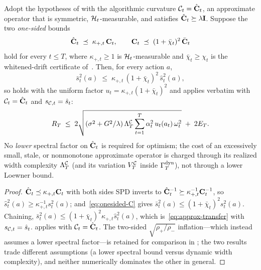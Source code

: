 \begin{theorem}\label{thm:spectral-distortion}
Adopt the hypotheses of  with the algorithmic curvature
$\mathcal{C}_t=\hat{\mathbf{C}}_t$, an approximate operator that is symmetric,
$\mathcal{H}_t$-measurable, and satisfies $\hat{\mathbf{C}}_t\succeq\lambda\mathbf{I}$.  Suppose
the two \emph{one-sided} bounds
\begin{equation}\label{eq:approx-onesided}
  \hat{\mathbf{C}}_t \;\preceq\; \kappa_{+,t}\,\mathbf{C}_t,
  \qquad
  \mathbf{C}_t \;\preceq\; (1+\bar\chi_t)^2\,\bar{\mathbf{C}}_t
\end{equation}
hold for every $t\le T$, where $\kappa_{+,t}\ge1$ is $\mathcal{H}_t$-measurable
and $\bar\chi_t\ge\chi_t$ is the whitened-drift certificate
of~.  Then, for every action $a$,
\begin{equation}\label{eq:approx-transfer}
  \bar s_t^2(a)\;\le\;\kappa_{+,t}\,(1+\bar\chi_t)^2\,\hat s_t^2(a),
\end{equation}
so  holds with the uniform factor
$u_t=\kappa_{+,t}(1+\bar\chi_t)^2$ and  applies verbatim
with $\mathcal{C}_t=\hat{\mathbf{C}}_t$ and $s_{\mathcal{C},t}=\hat s_t$:
\[
  R_T\;\le\;2\sqrt{(\sigma^2+G^2/\lambda)\,\Lambda^{\mathcal{C}}_T
    \sum_{t=1}^T\alpha_t^2\,u_t(a_t)\,\omega_t^2}\;+\;2E_T .
\]
No \emph{lower} spectral factor on $\hat{\mathbf{C}}_t$ is required for optimism; the
cost of an excessively small, stale, or nonmonotone approximate operator is
charged through its realized width complexity $\Lambda^{\mathcal{C}}_T$ (and its variation
$V^{\mathcal{C}}_T$ inside $\Gamma^{\mathrm{dyn}}_T$), not through a lower Loewner bound.
\end{theorem}
\begin{proof}
$\hat{\mathbf{C}}_t\preceq\kappa_{+,t}\mathbf{C}_t$ with both sides SPD inverts to
$\hat{\mathbf{C}}_t^{-1}\succeq\kappa_{+,t}^{-1}\mathbf{C}_t^{-1}$, so
$\hat s_t^2(a)\ge\kappa_{+,t}^{-1}s_t^2(a)$; and~\eqref{eq:onesided-C} gives
$\bar s_t^2(a)\le(1+\bar\chi_t)^2 s_t^2(a)$.  Chaining,
$\bar s_t^2(a)\le(1+\bar\chi_t)^2\kappa_{+,t}\hat s_t^2(a)$, which
is~\eqref{eq:approx-transfer} with $s_{\mathcal{C},t}=\hat s_t$.
 applies with $\mathcal{C}_t=\hat{\mathbf{C}}_t$.  The two-sided
$\sqrt{\rho_+/\rho_-}$ inflation---which instead assumes a lower spectral
factor---is retained for comparison in ; the two results
trade different assumptions (a lower spectral bound versus dynamic width
complexity), and neither numerically dominates the other in general.
\end{proof}

